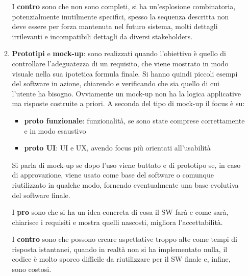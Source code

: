 \begin{itemize}
\begin{enumerate}
                        I \textbf{contro} sono che non sono completi,
                        si ha un'esplosione combinatoria, potenzialmente
                        inutilmente specifici, spesso la sequenza descritta non
                        deve essere per forza mantenuta nel futuro sistema,
                        molti dettagli irrilevanti e incompatibili dettagli da
                        diversi stakeholders.
                  \item \textbf{Prototipi} e \textbf{mock-up}: sono realizzati quando
                        l'obiettivo è quello di controllare l'adeguatezza di un requisito, che
                        viene mostrato in modo visuale nella sua ipotetica formula finale. Si
                        hanno quindi piccoli esempi del software in azione, chiarendo e verificando
                        che sia quello di cui l'utente ha bisogno. Ovviamente un mock-up non ha
                        la logica applicative ma risposte costruite a priori. A seconda del tipo
                        di mock-up il focus è su:
                        \begin{itemize}
                              \item \textbf{proto funzionale}: funzionalità, se sono state comprese correttamente e in modo
                                    esaustivo
                              \item \textbf{proto UI}: UI e UX, avendo focus più orientati all'usabilità
                        \end{itemize}
                        Si parla di mock-up se dopo l'uso viene buttato e di prototipo se, in caso
                        di approvazione, viene usato come base del software o comunque riutilizzato
                        in qualche modo, fornendo eventualmente una base evolutiva del software finale.

                        I \textbf{pro} sono che si ha un idea concreta di cosa
                        il SW farà e come sarà, chiarisce i requisiti e mostra
                        quelli nascosti, migliora l'accettabilità.

                        I \textbf{contro} sono che possono creare aspettative troppo
                        alte come tempi di risposta istantanei, quando in realtà
                        non si ha implementato nulla, il codice è molto sporco
                        difficile da riutilizzare per il SW finale e, infine, sono costosi.


\end{enumerate}
\end{itemize}
